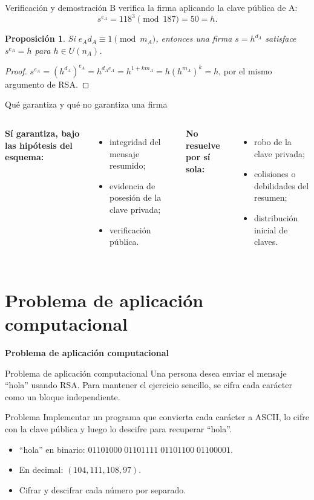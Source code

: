 \documentclass[aspectratio=169,11pt]{beamer}
\newtheorem{proposicion}{Proposición}
\newcommand{\modn}[1]{\pmod{#1}}
\begin{document}
\begin{frame}{Verificación y demostración}
  B verifica la firma aplicando la clave pública de A:
  \[
    s^{e_A}=118^3\modn{187}=50=h.
  \]
  \begin{proposicion}
    Si $e_A d_A\equiv1\modn{m_A}$, entonces una firma $s=h^{d_A}$ satisface $s^{e_A}=h$ para $h\in U(n_A)$.
  \end{proposicion}
  \begin{proof}
    $s^{e_A}=(h^{d_A})^{e_A}=h^{d_Ae_A}=h^{1+km_A}=h(h^{m_A})^k=h$,
    por el mismo argumento de RSA.
  \end{proof}
\end{frame}

\begin{frame}{Qué garantiza y qué no garantiza una firma}
  \begin{columns}[T]
    \textbf{Sí garantiza, bajo las hipótesis del esquema:}
    \begin{itemize}
      \item integridad del mensaje resumido;
      \item evidencia de posesión de la clave privada;
      \item verificación pública.
    \end{itemize}
    \textbf{No resuelve por sí sola:}
    \begin{itemize}
      \item robo de la clave privada;
      \item colisiones o debilidades del resumen;
      \item distribución inicial de claves.
    \end{itemize}
  \end{columns}
\end{frame}

\section{Problema de aplicación computacional}

\begin{frame}
  \centering
  \vfill
  {\LARGE\bfseries Problema de aplicación computacional}
  \vfill
\end{frame}

\begin{frame}{Problema de aplicación computacional}
  Una persona desea enviar el mensaje ``hola'' usando RSA. Para mantener el ejercicio sencillo, se cifra cada carácter como un bloque independiente.
  \begin{block}{Problema}
    Implementar un programa que convierta cada carácter a ASCII, lo cifre con la clave pública y luego lo descifre para recuperar ``hola''.
  \end{block}
  \begin{itemize}
    \item ``hola'' en binario: $01101000\;01101111\;01101100\;01100001$.
    \item En decimal: $(104,111,108,97)$.
    \item Cifrar y descifrar cada número por separado.
  \end{itemize}
\end{frame}
\end{document}
